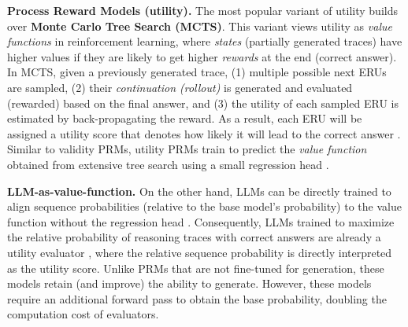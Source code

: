 \textbf{Process Reward Models (utility).} \hspace{0.1cm} The most popular variant of utility builds over \textbf{Monte Carlo Tree Search (MCTS)}. This variant views utility as \textit{value functions} in reinforcement learning, where \textit{states} (partially generated traces) have higher values if they are likely to get higher \textit{rewards} at the end (correct answer). In MCTS, given a previously generated trace, (1) multiple possible next ERUs are sampled, (2) their \textit{continuation (rollout)} is generated and evaluated (rewarded) based on the final answer, and (3) the utility of each sampled ERU is estimated by back-propagating the reward. As a result, each ERU will be assigned a utility score that denotes how likely it will lead to the correct answer \citep{hao-etal-2023-reasoning, xie2024montecarlotreesearch, wang-etal-2024-math}. Similar to validity PRMs, utility PRMs train to predict the \textit{value function} obtained from extensive tree search using a small regression head \citep{wang-etal-2024-math, he-etal-2024-advancing, zhang2025lessonsdevelopingprocessreward}.


\textbf{LLM-as-value-function.} On the other hand, LLMs can be directly trained to align sequence probabilities (relative to the base model's probability) to the value function without the regression head \citep{schulman2017proximalpolicyoptimizationalgorithms, NEURIPS2023_a85b405e}. Consequently, LLMs trained to maximize the relative probability of reasoning traces with correct answers are already a utility evaluator \citep{mahan2024generativerewardmodels, lai2024stepdpostepwisepreferenceoptimization, xie2024montecarlotreesearch, pang2024iterativereasoningpreferenceoptimization, cui2025processreinforcementimplicitrewards}, where the relative sequence probability is directly interpreted as the utility score. Unlike PRMs that are not fine-tuned for generation, these models retain (and improve) the ability to generate. However, these models require an additional forward pass to obtain the base probability, doubling the computation cost of evaluators.




